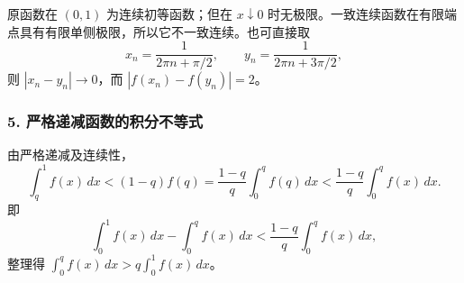 \documentclass[11pt,fontset=fandol]{ctexart}
\begin{document}
原函数在 \((0,1)\) 为连续初等函数；但在 \(x\downarrow0\)
时无极限。一致连续函数在有限端点具有有限单侧极限，所以它不一致连续。也可直接取
\[
x_n=\frac1{2\pi n+\pi/2},\qquad y_n=\frac1{2\pi n+3\pi/2},
\] 则 \(|x_n-y_n|\to0\)，而 \(|f(x_n)-f(y_n)|=2\)。

\subsubsection{5.
严格递减函数的积分不等式}\label{ux4e25ux683cux9012ux51cfux51fdux6570ux7684ux79efux5206ux4e0dux7b49ux5f0f}

由严格递减及连续性， \[
\int_q^1f(x)\,dx<(1-q)f(q)
=\frac{1-q}{q}\int_0^qf(q)\,dx
<\frac{1-q}{q}\int_0^qf(x)\,dx.
\] 即 \[
\int_0^1f(x)\,dx-\int_0^qf(x)\,dx
<\frac{1-q}{q}\int_0^qf(x)\,dx,
\] 整理得 \(\int_0^qf(x)\,dx>q\int_0^1f(x)\,dx\)。
\end{document}
